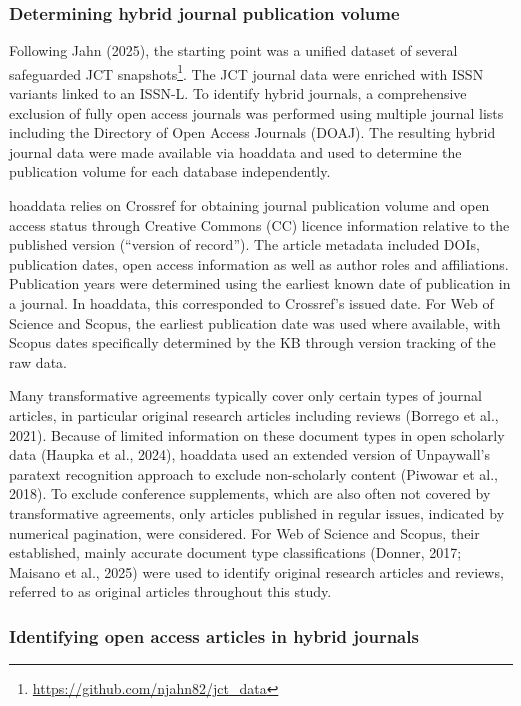 \documentclass[a4paper,man,floatsintext,longtable,noextraspace,10pt]{apa6}
\begin{document}
\subsubsection{Determining hybrid journal publication
volume}\label{determining-hybrid-journal-publication-volume}

Following Jahn (2025), the starting point was a unified dataset of
several safeguarded JCT snapshots\footnote{\url{https://github.com/njahn82/jct_data}}.
The JCT journal data were enriched with ISSN variants linked to an
ISSN-L. To identify hybrid journals, a comprehensive exclusion of fully
open access journals was performed using multiple journal lists
including the Directory of Open Access Journals (DOAJ). The resulting
hybrid journal data were made available via hoaddata and used to
determine the publication volume for each database independently.

hoaddata relies on Crossref for obtaining journal publication volume and
open access status through Creative Commons (CC) licence information
relative to the published version (``version of record''). The article
metadata included DOIs, publication dates, open access information as
well as author roles and affiliations. Publication years were determined
using the earliest known date of publication in a journal. In hoaddata,
this corresponded to Crossref's issued date. For Web of Science and
Scopus, the earliest publication date was used where available, with
Scopus dates specifically determined by the KB through version tracking
of the raw data.

Many transformative agreements typically cover only certain types of
journal articles, in particular original research articles including
reviews (Borrego et al., 2021). Because of limited information on these
document types in open scholarly data (Haupka et al., 2024), hoaddata
used an extended version of Unpaywall's paratext recognition approach to
exclude non-scholarly content (Piwowar et al., 2018). To exclude
conference supplements, which are also often not covered by
transformative agreements, only articles published in regular issues,
indicated by numerical pagination, were considered. For Web of Science
and Scopus, their established, mainly accurate document type
classifications (Donner, 2017; Maisano et al., 2025) were used to
identify original research articles and reviews, referred to as original
articles throughout this study.

\subsubsection{Identifying open access articles in hybrid
journals}\label{identifying-open-access-articles-in-hybrid-journals}
\end{document}
